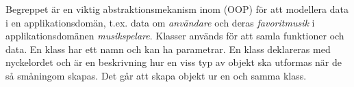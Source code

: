 



\ifkompendium
Begreppet  är en viktig abstraktionsmekanism inom  (OOP) för att modellera data i en applikationsdomän, t.ex. data om \emph{användare} och deras \emph{favoritmusik} i applikationsdomänen \emph{musikspelare}. Klasser används för att samla funktioner och data. En klass har ett namn och kan ha parametrar. En klass deklareras med nyckelordet  och är en beskrivning hur en viss typ av objekt ska utformas när de så småningom skapas. Det går att skapa  objekt ur en och samma klass. 
\fi


